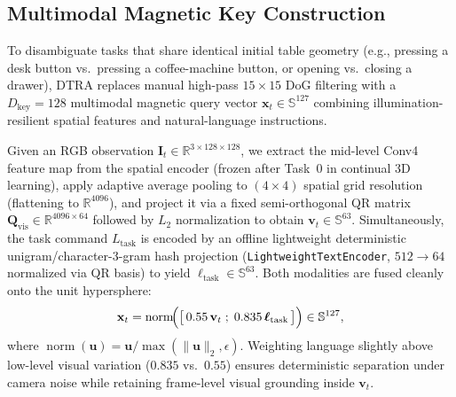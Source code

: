 \documentclass[10pt,twocolumn]{article}
\begin{document}
\subsection{Multimodal Magnetic Key Construction}
To disambiguate tasks that share identical initial table geometry (e.g., pressing a desk button vs.\ pressing a coffee-machine button, or opening vs.\ closing a drawer), DTRA replaces manual high-pass $15\times 15$ DoG filtering with a $D_{\text{key}}=128$ multimodal magnetic query vector $\mathbf{x}_t \in \mathbb{S}^{127}$ combining illumination-resilient spatial features and natural-language instructions.

Given an RGB observation $\mathbf{I}_t \in \mathbb{R}^{3 \times 128 \times 128}$, we extract the mid-level Conv4 feature map from the spatial encoder (frozen after Task~0 in continual 3D learning), apply adaptive average pooling to $(4\times 4)$ spatial grid resolution (flattening to $\mathbb{R}^{4096}$), and project it via a fixed semi-orthogonal QR matrix $\mathbf{Q}_{\text{vis}} \in \mathbb{R}^{4096 \times 64}$ followed by $L_2$ normalization to obtain $\mathbf{v}_t \in \mathbb{S}^{63}$. Simultaneously, the task command $L_{\text{task}}$ is encoded by an offline lightweight deterministic unigram/character-3-gram hash projection (\texttt{LightweightTextEncoder}, $512 \to 64$ normalized via QR basis) to yield $\boldsymbol{\ell}_{\text{task}} \in \mathbb{S}^{63}$. Both modalities are fused cleanly onto the unit hypersphere:
\begin{equation}
  \mathbf{x}_t = \operatorname{norm}\!\Bigl(\bigl[\,0.55\,\mathbf{v}_t \;;\; 0.835\,\boldsymbol{\ell}_{\text{task}}\,\bigr]\Bigr) \in \mathbb{S}^{127},
\end{equation}
where $\operatorname{norm}(\mathbf{u}) = \mathbf{u} / \max(\|\mathbf{u}\|_2, \epsilon)$. Weighting language slightly above low-level visual variation ($0.835$ vs.\ $0.55$) ensures deterministic separation under camera noise while retaining frame-level visual grounding inside $\mathbf{v}_t$.
\end{document}
